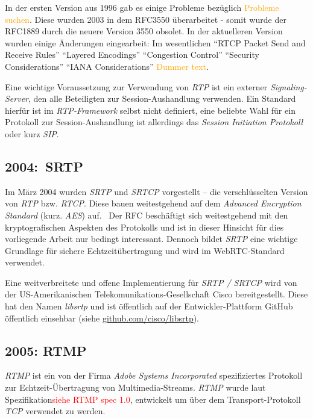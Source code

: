 \documentclass{article}
\begin{document}
\begin{onecolumn}
In der ersten Version aus 1996 gab es einige Probleme bezüglich
\textcolor{orange}{Probleme suchen}. Diese wurden 2003 in dem RFC3550
überarbeitet - somit wurde der RFC1889 durch die neuere Version 3550 obsolet.
In der aktuelleren Version wurden einige Änderungen eingearbeit: Im
wesentlichen ``RTCP Packet Send and Receive Rules'' ``Layered Encodings''
``Congestion Control'' ``Security Considerations'' ``IANA Considerations''
\textcolor{orange}{Dummer text}.

Eine wichtige Voraussetzung zur Verwendung von \textit{RTP} ist ein externer
\textit{Signaling-Server}, den alle Beteiligten zur Session-Aushandlung
verwenden. Ein Standard hierfür ist im \textit{RTP-Framework} selbst nicht
definiert, eine beliebte Wahl für ein Protokoll zur Session-Aushandlung ist
allerdings das \textit{Session Initiation Protokoll} oder kurz
\textit{SIP}.~\cite{RFC3550, RFC3261}

\subsection{2004:\ SRTP}

Im März 2004 wurden \textit{SRTP} und \textit{SRTCP} vorgestellt – die
verschlüsselten Version von \textit{RTP} bzw. \textit{RTCP}. Diese bauen
weitestgehend auf dem \textit{Advanced Encryption Standard} (kurz.
\textit{AES}) auf.~\cite{RFC3711} Der RFC beschäftigt sich weitestgehend mit
den kryptografischen Aspekten des Protokolls und ist in dieser Hinsicht für
dies vorliegende Arbeit nur bedingt interessant. Dennoch bildet
\textit{SRTP} eine wichtige Grundlage für sichere Echtzeitübertragung und
wird im WebRTC-Standard verwendet.

Eine weitverbreitete und offene Implementierung für \textit{SRTP / SRTCP}
wird von der US-Amerikanischen Telekomunikations-Gesellschaft Cisco
bereitgestellt. Diese hat den Namen \textit{libsrtp} und ist öffentlich auf der
Entwickler-Plattform GitHub öffentlich einsehbar (siehe
\href{https://github.com/cisco/libsrtp}{github.com/cisco/libsrtp}).


\subsection{2005: RTMP}

\textit{RTMP} ist ein von der Firma \textit{Adobe Systems Incorporated}
spezifiziertes Protokoll zur Echtzeit-Übertragung von Multimedia-Streams.
\textit{RTMP} wurde laut Spezifikation\textcolor{red}{siehe RTMP spec 1.0},
entwickelt um über dem Transport-Protokoll \textit{TCP} verwendet zu werden.


\end{onecolumn}
\end{document}
